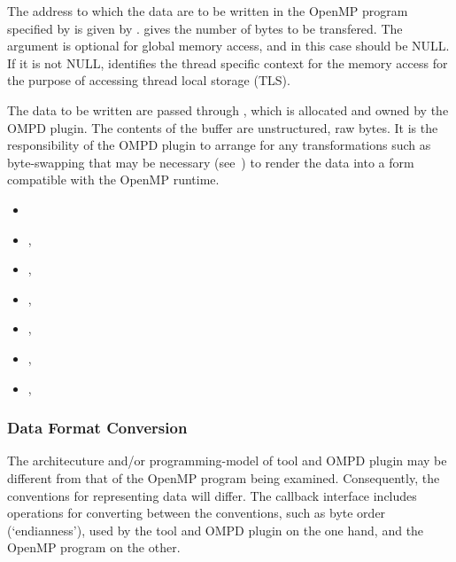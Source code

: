 \argdesc
The address to which the data are to be written in the OpenMP program
specified by  is given by .
 gives the number of bytes to be transfered.
The  argument is optional for global memory access,
and in this case should be NULL.
If it is not NULL,  identifies the thread
specific context for the memory access for the purpose of accessing
thread local storage (TLS).

The data to be written are passed through , which is allocated and
owned by the OMPD plugin.
The contents of the buffer are unstructured, raw bytes.
It is the responsibility of the OMPD plugin to arrange for
any transformations such as byte-swapping that may be necessary
(see~)
to render the data into a form compatible with the OpenMP runtime.

\crossreferences
\begin{itemize}
\item
   
\item
  , 
\item
  , 
\item
  , 
\item
  , 
\item
  , 
\item
  , 
\end{itemize}

\subsubsection{Data Format Conversion}
\label{ompd:data-format-conversion}

The architecuture and/or programming-model of tool and
OMPD plugin may be different from that of the OpenMP program being
examined.
Consequently, the conventions for representing data will differ.
The callback interface includes operations for converting between
the conventions, such as byte order (`endianness'),
used by the tool and OMPD plugin on the
one hand, and the OpenMP program on the other.

